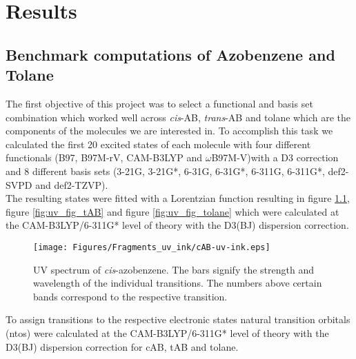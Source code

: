 \chapter{Results} \label{abs:ergebnis}
\section{Benchmark computations of Azobenzene and Tolane}
%
The first objective of this project was to select a functional and basis set combination which worked well across \textit{cis}-AB, \textit{trans}-AB and tolane which are the components of the molecules we are interested in. To accomplish this task we calculated the first 20 excited states of each molecule with four different functionals (B97, B97M-rV, CAM-B3LYP and $\omega$B97M-V)with a D3 correction and 8 different basis sets (3-21G, 3-21G*, 6-31G, 6-31G*, 6-311G, 6-311G*, def2-SVPD and def2-TZVP).\\
The resulting states were fitted with a Lorentzian function resulting in figure \ref{fig:uv_fig_cAB}, figure \ref{fig:uv_fig_tAB} and figure \ref{fig:uv_fig_tolane} which were calculated at the CAM-B3LYP/6-311G* level of theory with the D3(BJ) dispersion correction.
%
%
%
%
\begin{figure}[H]
    \centering
    \texttt{[image: Figures/Fragments\_uv\_ink/cAB-uv-ink.eps]}
    \caption{UV spectrum of \textit{cis}-azobenzene. The bars signify the strength and wavelength of the individual transitions. The numbers above certain bands correspond to the respective transition.}
    \label{fig:uv_fig_cAB}
\end{figure}
%
%
%
To assign transitions to the respective electronic states natural transition orbitals (ntos) were calculated at the CAM-B3LYP/6-311G* level of theory with the D3(BJ) dispersion correction for cAB, tAB and tolane.\\
